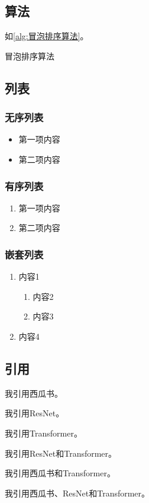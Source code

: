

\subsection{算法}

如\cref{alg:冒泡排序算法}。

\begin{algorithm}[htb]
\caption{冒泡排序算法}
\label{alg:冒泡排序算法}
\end{algorithm}

\subsection{列表}

\subsubsection{无序列表}

\begin{itemize}
    \item 第一项内容
    \item 第二项内容
\end{itemize}

\subsubsection{有序列表}

\begin{enumerate}
    \item 第一项内容
    \item 第二项内容
\end{enumerate}

\subsubsection{嵌套列表}

\begin{enumerate}
    \item 内容1
    \begin{enumerate}
        \item 内容2
        \item 内容3
    \end{enumerate}
    \item 内容4
\end{enumerate}

\subsection{引用}

我引用西瓜书\cite{西瓜书}。

我引用ResNet\cite{ResNet}。

我引用Transformer\cite{Transformer}。

我引用ResNet和Transformer\cite{ResNet, Transformer}。

我引用西瓜书和Transformer\cite{西瓜书, Transformer}。

我引用西瓜书、ResNet和Transformer\cite{西瓜书, ResNet, Transformer}。